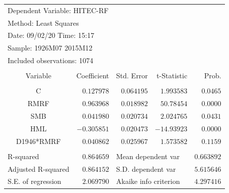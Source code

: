 \documentclass[12pt]{article}
\numberwithin{equation}{section} %
\begin{document}
\begin{table}[H]
\centering
\begin{tabular}{lrrrr}
\multicolumn{3}{l}{Dependent Variable: HITEC-RF}&\multicolumn{1}{c}{}&\multicolumn{1}{c}{}\\
\multicolumn{2}{l}{Method: Least Squares}&\multicolumn{1}{c}{}&\multicolumn{1}{c}{}&\multicolumn{1}{c}{}\\
\multicolumn{2}{l}{Date: 09/02/20   Time: 15:17}&\multicolumn{1}{c}{}&\multicolumn{1}{c}{}&\multicolumn{1}{c}{}\\
\multicolumn{2}{l}{Sample: 1926M07 2015M12}&\multicolumn{1}{c}{}&\multicolumn{1}{c}{}&\multicolumn{1}{c}{}\\
\multicolumn{3}{l}{Included observations: 1074}&\multicolumn{1}{c}{}&\multicolumn{1}{c}{}\\
[4.5pt] \hline \\ [-4.5pt]
\multicolumn{1}{c}{Variable}&\multicolumn{1}{r}{Coefficient}&\multicolumn{1}{r}{Std. Error}&\multicolumn{1}{r}{t-Statistic}&\multicolumn{1}{r}{Prob.}\\
[4.5pt] \hline \\ [-4.5pt]
\multicolumn{1}{c}{C}&\multicolumn{1}{r}{$0.127978$}&\multicolumn{1}{r}{$0.064195$}&\multicolumn{1}{r}{$1.993583$}&\multicolumn{1}{r}{$0.0465$}\\
\multicolumn{1}{c}{RMRF}&\multicolumn{1}{r}{$0.963968$}&\multicolumn{1}{r}{$0.018982$}&\multicolumn{1}{r}{$50.78454$}&\multicolumn{1}{r}{$0.0000$}\\
\multicolumn{1}{c}{SMB}&\multicolumn{1}{r}{$0.041980$}&\multicolumn{1}{r}{$0.020734$}&\multicolumn{1}{r}{$2.024765$}&\multicolumn{1}{r}{$0.0431$}\\
\multicolumn{1}{c}{HML}&\multicolumn{1}{r}{$-0.305851$}&\multicolumn{1}{r}{$0.020473$}&\multicolumn{1}{r}{$-14.93923$}&\multicolumn{1}{r}{$0.0000$}\\
\multicolumn{1}{c}{D1946*RMRF}&\multicolumn{1}{r}{$0.040862$}&\multicolumn{1}{r}{$0.025967$}&\multicolumn{1}{r}{$1.573582$}&\multicolumn{1}{r}{$0.1159$}\\
[4.5pt] \hline \\ [-4.5pt]
\multicolumn{1}{l}{R-squared}&\multicolumn{1}{r}{$0.864659$}&\multicolumn{2}{l}{Mean dependent var}&\multicolumn{1}{r}{$0.663892$}\\
\multicolumn{1}{l}{Adjusted R-squared}&\multicolumn{1}{r}{$0.864152$}&\multicolumn{2}{l}{S.D. dependent var}&\multicolumn{1}{r}{$5.615646$}\\
\multicolumn{1}{l}{S.E. of regression}&\multicolumn{1}{r}{$2.069790$}&\multicolumn{2}{l}{Akaike info criterion}&\multicolumn{1}{r}{$4.297416$}\\

\end{tabular}
\end{table}
\end{document}
